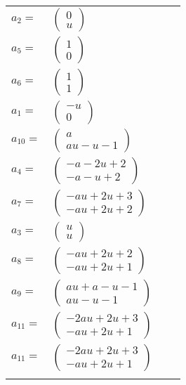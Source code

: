 \documentclass[1p]{elsarticle_modified}
\theoremstyle{definition}
\begin{document}
\begin{tabular}{m{7pt} m{180pt} m{7pt} m{180pt} }
\flushright $a_{2}=$&$\begin{pmatrix}0\\u\end{pmatrix}$ \\
\flushright $a_{5}=$&$\begin{pmatrix}1\\0\end{pmatrix}$ \\
\flushright $a_{6}=$&$\begin{pmatrix}1\\1\end{pmatrix}$ \\
\flushright $a_{1}=$&$\begin{pmatrix}- u\\0\end{pmatrix}$ \\
\flushright $a_{10}=$&$\begin{pmatrix}a\\a u- u-1\end{pmatrix}$ \\
\flushright $a_{4}=$&$\begin{pmatrix}- a-2 u+2\\- a- u+2\end{pmatrix}$ \\
\flushright $a_{7}=$&$\begin{pmatrix}- a u+2 u+3\\- a u+2 u+2\end{pmatrix}$ \\
\flushright $a_{3}=$&$\begin{pmatrix}u\\u\end{pmatrix}$ \\
\flushright $a_{8}=$&$\begin{pmatrix}- a u+2 u+2\\- a u+2 u+1\end{pmatrix}$ \\
\flushright $a_{9}=$&$\begin{pmatrix}a u+a- u-1\\a u- u-1\end{pmatrix}$ \\
\flushright $a_{11}=$&$\begin{pmatrix}-2 a u+2 u+3\\- a u+2 u+1\end{pmatrix}$\\ \flushright $a_{11}=$&$\begin{pmatrix}-2 a u+2 u+3\\- a u+2 u+1\end{pmatrix}$\\&\end{tabular}
\end{document}
